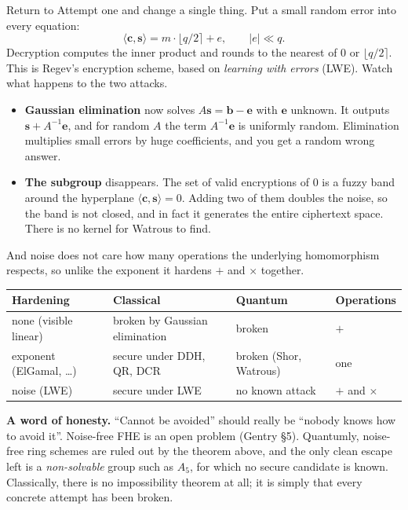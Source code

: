 \documentclass[11pt,a4paper]{article}
\renewcommand{\vec}[1]{\bm{#1}}
\newcommand{\inner}[2]{\langle #1,#2\rangle}
\newcommand{\round}[1]{\lfloor #1\rceil}
\begin{document}
Return to Attempt one and change a single thing. Put a small random error
into every equation:
\[
\inner{\vec c}{\vec s}=m\cdot\round{q/2}+e,\qquad |e|\ll q .
\]
Decryption computes the inner product and rounds to the nearest of $0$ or
$\round{q/2}$. This is Regev's encryption scheme, based on \emph{learning
with errors} (LWE). Watch what happens to the two attacks.
\begin{itemize}[leftmargin=*]
\item \textbf{Gaussian elimination} now solves $A\vec s=\vec b-\vec e$ with
  $\vec e$ unknown. It outputs $\vec s+A^{-1}\vec e$, and for random $A$ the
  term $A^{-1}\vec e$ is uniformly random. Elimination multiplies small errors
  by huge coefficients, and you get a random wrong answer.
\item \textbf{The subgroup} disappears. The set of valid encryptions of $0$ is
  a fuzzy band around the hyperplane $\inner{\vec c}{\vec s}=0$. Adding two of
  them doubles the noise, so the band is not closed, and in fact it generates
  the entire ciphertext space. There is no kernel for Watrous to find.
\end{itemize}
And noise does not care how many operations the underlying homomorphism
respects, so unlike the exponent it hardens $+$ and $\times$ together.

\begin{center}\small
\begin{tabularx}{\textwidth}{@{}l X X l@{}}
\toprule
\textbf{Hardening} & \textbf{Classical} & \textbf{Quantum} & \textbf{Operations}\\
\midrule
none (visible linear) & broken by Gaussian elimination & broken & $+$\\
exponent (ElGamal, \dots) & secure under DDH, QR, DCR & broken (Shor, Watrous) & one\\
noise (LWE) & secure under LWE & no known attack & $+$ and $\times$\\
\bottomrule
\end{tabularx}
\end{center}

\begin{careful}
\textbf{A word of honesty.} ``Cannot be avoided'' should really be ``nobody
knows how to avoid it''. Noise-free FHE is an open problem (Gentry \S5).
Quantumly, noise-free ring schemes are ruled out by the theorem above, and
the only clean escape left is a \emph{non-solvable} group such as $A_5$, for
which no secure candidate is known. Classically, there is no impossibility
theorem at all; it is simply that every concrete attempt has been broken.
\end{careful}
\end{document}
